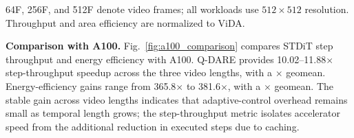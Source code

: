 \begin{table}[!t]
\centering
\caption{Implementation and normalized comparison with ViDA.}
\label{tab:vida_comparison}
\scriptsize
\setlength{\tabcolsep}{3.0pt}
\renewcommand{\arraystretch}{1.04}
\vspace{1pt}
\parbox{\columnwidth}{\scriptsize
64F, 256F, and 512F denote video frames; all workloads use $512\times512$ resolution. Throughput and area efficiency are normalized to ViDA.}
\end{table}

\textbf{Comparison with A100.}
Fig.~\ref{fig:a100_comparison} compares STDiT step throughput and energy efficiency with A100. Q-DARE provides 10.02--11.88$\times$ step-throughput speedup across the three video lengths, with a \QDAREStepGeoA$\times$ geomean. Energy-efficiency gains range from 365.8$\times$ to 381.6$\times$, with a \QDAREEnergyGeoA$\times$ geomean. The stable gain across video lengths indicates that adaptive-control overhead remains small as temporal length grows; the step-throughput metric isolates accelerator speed from the additional reduction in executed steps due to caching.

